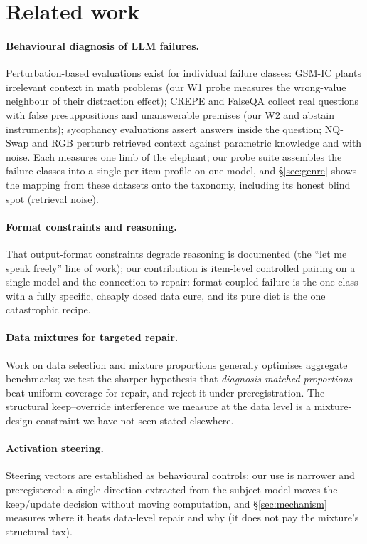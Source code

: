 \section{Related work}
\label{sec:related}

\paragraph{Behavioural diagnosis of LLM failures.} Perturbation-based
evaluations exist for individual failure classes: GSM-IC plants irrelevant
context in math problems (our W1 probe measures the wrong-value neighbour of
their distraction effect); CREPE and FalseQA collect real questions with false
presuppositions and unanswerable premises (our W2 and abstain instruments);
sycophancy evaluations assert answers inside the question; NQ-Swap and RGB
perturb retrieved context against parametric knowledge and with noise. Each
measures one limb of the elephant; our probe suite assembles the failure
classes into a single per-item profile on one model, and \S\ref{sec:genre}
shows the mapping from these datasets onto the taxonomy, including its honest
blind spot (retrieval noise).

\paragraph{Format constraints and reasoning.} That output-format constraints
degrade reasoning is documented (the ``let me speak freely'' line of work); our
contribution is item-level controlled pairing on a single model and the
connection to repair: format-coupled failure is the one class with a fully
specific, cheaply dosed data cure, and its pure diet is the one catastrophic recipe.

\paragraph{Data mixtures for targeted repair.} Work on data selection and
mixture proportions generally optimises aggregate benchmarks; we test the
sharper hypothesis that \emph{diagnosis-matched proportions} beat uniform
coverage for repair, and reject it under preregistration. The structural
keep--override interference we measure at the data level is a mixture-design
constraint we have not seen stated elsewhere.

\paragraph{Activation steering.} Steering vectors are established as
behavioural controls; our use is narrower and preregistered: a single
direction extracted from the subject model moves the keep/update decision
without moving computation, and \S\ref{sec:mechanism} measures where it beats
data-level repair and why (it does not pay the mixture's structural tax).
